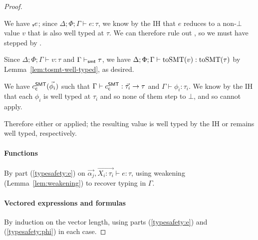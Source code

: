 \documentclass[acmsmall,screen,nonacm]{acmart}
\theoremstyle{definition}
\begin{document}
\begin{lemma}
\begin{proof}
\begin{proofcases}
  \item[(\rn{$\phi$-Unquote})] We have $\textbf{,}{e}$; since
  $\Delta; \Phi; \Gamma \vdash e : \tau$, we know by the IH that $e$
  reduces to a non-$\bot$ value $v$ that is also well typed at $\tau$.
%
  We can therefore rule out , so we must
  have stepped by .

  Since $\Delta; \Phi; \Gamma \vdash v : \tau$ and $\Gamma \vdash_{\mathsf{smt}} \tau$, we have
  $\Delta; \Phi; \Gamma \vdash \mathrm{toSMT}(v) : \mathrm{toSMT}(\tau)$ by
  Lemma~\ref{lem:tosmt-well-typed}, as desired.

  \item[(\rn{$\phi$-Ctor})] We have $c^\mathsf{SMT}_{\mathsf{c}}(\vec{\phi_i})$ such
  that $\Gamma \vdash c^\mathsf{SMT}_{\mathsf{c}} : \vec{\tau_i} \rightarrow \tau$ and
  $\Gamma \vdash \phi_i : \tau_i$. We know by the IH that each
  $\phi_i$ is well typed at $\tau_i$ and so none of them step to
  $\bot$, and so  cannot apply.

  Therefore either  or 
  applied; the resulting value is well typed by the IH or remains well
  typed, respectively.

\end{proofcases}

  \paragraph*{Functions}

By part (\ref{typesafety:e}) on
$\vec{\alpha_j}, \overrightarrow{X_i:\tau_i} \vdash e : \tau$, using
weakening (Lemma~\ref{lem:weakening}) to recover typing in $\Gamma$.

  \paragraph*{Vectored expressions and formulas}

By induction on the vector length, using parts (\ref{typesafety:e})
and (\ref{typesafety:phi}) in each case. \qedhere

\end{proof}
\end{lemma}
\end{document}
